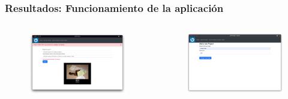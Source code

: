 \begin{frame}[plain,label=demo]
    \frametitle{Resultados: Funcionamiento de la aplicación}
    \begin{columns}
        \begin{column}{0.5\textwidth}
            \begin{figure}[H]
                \includegraphics[width=\textwidth]{include/app_images/project_not_found.png}
            \end{figure}
        \end{column}
        \begin{column}{0.5\textwidth}
            \begin{figure}[H]
                \includegraphics[width=\textwidth]{include/app_images/new_project.png}
            \end{figure}
        \end{column}
    \end{columns}
    
\end{frame}

